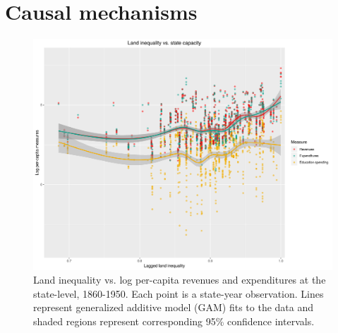 \documentclass[12pt]{article}
\begin{document}
\pagebreak
\section{Causal mechanisms}

\begin{figure}[htbp]
	\begin{center}
		\includegraphics[width=1\textwidth]{plots/ineq-capacity.png} 
	\end{center}
	\caption{Land inequality vs. log per-capita revenues and expenditures at the state-level, 1860-1950. Each point is a state-year observation. Lines represent generalized additive model (GAM) fits to the data and shaded regions represent corresponding 95\% confidence intervals.   \label{fig:ineq-capacity}}
\end{figure} 
\end{document}

